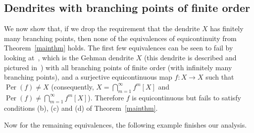 \documentclass[12pt]{amsart}
\theoremstyle{definition}
\numberwithin{equation}{section}
\DeclareMathOperator{\per}{Per}
\begin{document}
\subsection{Dendrites with branching points of finite order}

We now show that, if we drop the requirement that the dendrite $X$ has finitely many branching points, then none 
of the equivalences of equicontinuity from Theorem~\ref{mainthm} holds. The first few equivalences can be seen to fail by looking at~\cite[Example 5.4]{camargo-rincon-uzcategui}, which is the Gehman dendrite $X$ (this dendrite is described and pictured in~\cite[Example~10.39]{nadler}) with all branching points of finite order (with infinitely many branching points), and a surjective equicontinuous map $f \colon X\longrightarrow X$ such that $\per(f)\neq X$ (consequently, $X=\bigcap_{m=1}^\infty f^m[X]$ and $\per(f)\neq\bigcap_{m=1}^\infty f^m[X]$). Therefore $f$ is equicontinuous but fails to satisfy conditions (b), (c) and (d) of Theorem~\ref{mainthm}.

Now for the remaining equivalences, the following example finishes our analysis.
\end{document}
